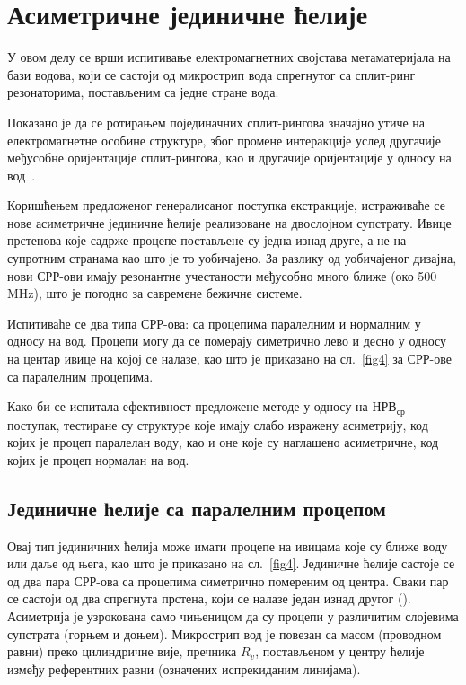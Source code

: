 \section{Асиметричне јединичне ћелије}\label{sekc3}

У овом делу се врши испитивање електромагнетних својстава метаматеријала на бази водова, који се састоји од микрострип вода спрегнутог са сплит-ринг резонаторима, постављеним са једне стране вода.

Показано је да се ротирањем појединачних сплит-рингова значајно утиче на електромагнетне особине структуре, због промене интеракције услед другачије међусобне оријентације сплит-рингова, као и другачије оријентације у односу на вод~\cite{stereo,bib9}.

Коришћењем предложеног генералисаног поступка екстракције, истраживаће се нове асиметричне јединичне ћелије реализоване на двослојном супстрату. Ивице прстенова које садрже процепе постављене су једна изнад друге, а не на супротним странама као што је то уобичајено. За разлику од уобичајеног дизајна, нови СРР-ови имају резонантне учестаности међусобно много ближе (око 500\,MHz), што је погодно за савремене бежичне системе.

Испитиваће се два типа СРР-ова: са процепима паралелним и нормалним у односу на вод. Процепи могу да се померају симетрично лево и десно у односу на центар ивице на којој се налазе, као што је приказано на сл.~\ref{fig4} за СРР-ове са паралелним процепима.

Како би се испитала ефективност предложене методе у односу на $НРВ_{ср}$ поступак, тестиране су структуре које имају слабо изражену асиметрију, код којих је процеп паралелан воду, као и оне које су наглашено асиметричне, код којих је процеп нормалан на вод.

\subsection{Јединичне ћелије са паралелним процепом}

Овај тип јединичних ћелија може имати процепе на ивицама које су ближе воду или даље од њега, као што је приказано на сл.~\ref{fig4}. Јединичне ћелије састоје се од два пара СРР-ова са процепима симетрично помереним од центра. Сваки пар се састоји од два спрегнута прстена, који се налазе један изнад другог (). Асиметрија је узрокована само чињеницом да су процепи у различитим слојевима супстрата (горњем и доњем). Микрострип вод је повезан са масом (проводном равни) преко цилиндричне вије, пречника $R_v$, постављеном у центру ћелије између референтних равни (означених испрекиданим линијама).

